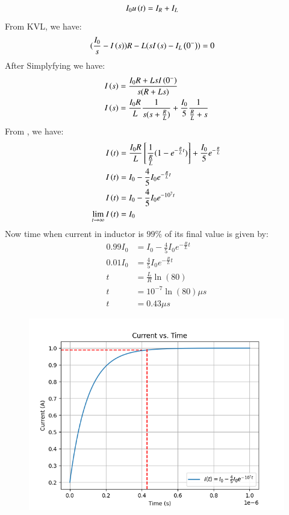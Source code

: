 \documentclass[journal,12pt,twocolumn]{IEEEtran}
\theoremstyle{remark}
\begin{document}
\begin{align}
    I_0u\left(t\right) &= I_R + I_L
\end{align}
From KVL, we have:
\begin{align}
    (\frac{I_0}{s} -I\left(s\right))R - L(sI\left(s\right) - I_L\left(0^-\right)) &=0
\end{align}
After Simplyfying we have:
\begin{align}
    I\left(s\right) &= \frac{ I_0R +LsI\left(0^-\right)}{s(R+Ls)}\\
    I\left(s\right) &= \frac{I_0R}{L}\frac{1}{s(s+\frac{R}{L})} + \frac{I_0}{5}\frac{1}{\frac{R}{L}+s}
\end{align}
From , we have:
\begin{align}
    I\left(t\right) & = \frac{I_0R}{L} {}\left[\frac{1}{\frac{R}{L}}(1-e^{-\frac{R}{L}t})\right] + \frac{I_0}{5}e^{-\frac{R}{L}}\\
    I\left(t\right) &= I_0 -\frac{4}{5}I_0e^{-\frac{R}{L}t}\\
    I\left(t\right) &= I_0 -\frac{4}{5}I_0e^{-10^{7}t}\\
    \lim_{t \to \infty} I\left(t\right) &= I_0
\end{align}
Now time when current in inductor is $99\%$ of its final value is given by:
\begin{align}
    0.99I_0 &= I_0 -\frac{4}{5}I_0e^{-\frac{R}{L}t}\\
    0.01I_0 &= \frac{4}{5}I_0e^{-\frac{R}{L}t}\\
    t &= \frac{L}{R}\ln(80)\\
    t &= 10^{-7}\ln(80) \mu s\\
    t &= 0.43 \mu s
\end{align}
\begin{figure}[ht!]
	\includegraphics[width=\columnwidth]{2023/IN/47/plots/Figure_1.png}
\end{figure}

  
\end{document}
